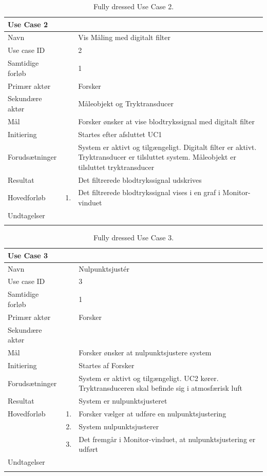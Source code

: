 \begin{longtabu} to  %
    {\large \textbf{Use Case 2}} && \\
    \toprule
    Navn &&    Vis Måling med digitalt filter\\
    Use case ID &&    2\\
    Samtidige forløb &&    1\\
    Primær aktør &&    Forsker\\
    Sekundære aktør &&	 Måleobjekt og Tryktransducer\\
    Mål &&    Forsker ønsker at vise blodtrykssignal med digitalt filter\\
    Initiering &&	Startes efter afsluttet UC1\\
    Forudsætninger &&  System er aktivt og tilgængeligt. Digitalt filter er aktivt. Tryktransducer er tilsluttet system. Måleobjekt er tilsluttet tryktransducer\\
    Resultat &&		Det filtrerede blodtrykssignal udskrives                         \\ \midrule
    Hovedforløb &    1. &    Det filtrerede blodtrykssignal vises i en graf i Monitor-vinduet\newline\\ \midrule
                
    Undtagelser &    &   \\ \bottomrule
\caption{Fully dressed Use Case 2.}
\label{UC2}
\end{longtabu}


\begin{longtabu} to  %
    {\large \textbf{Use Case 3}} && \\
    \toprule
    Navn &&    Nulpunktsjustér\\
    Use case ID &&    3\\
    Samtidige forløb &&    1\\
    Primær aktør &&    Forsker\\
    Sekundære aktør && \\
    Mål &&    Forsker ønsker at nulpunktsjustere system\\
    Initiering &&	Startes af Forsker\\
    Forudsætninger &&  System er aktivt og tilgængeligt. UC2 kører. Tryktransduceren skal befinde sig i atmosfærisk luft  \\    
    Resultat &&		System er nulpunktsjusteret\\ \midrule
    Hovedforløb &    1. &    Forsker vælger at udføre en nulpunktsjustering\\[-1ex]   						 	
                &    2. &    System nulpunktsjusterer\\[-1ex]
                &	 3.	&	 Det fremgår i Monitor-vinduet, at nulpunktsjustering er udført\newline\\ \midrule
                
    Undtagelser &     &      \\ \bottomrule
\caption{Fully dressed Use Case 3.}
\label{UC3}
\end{longtabu}

